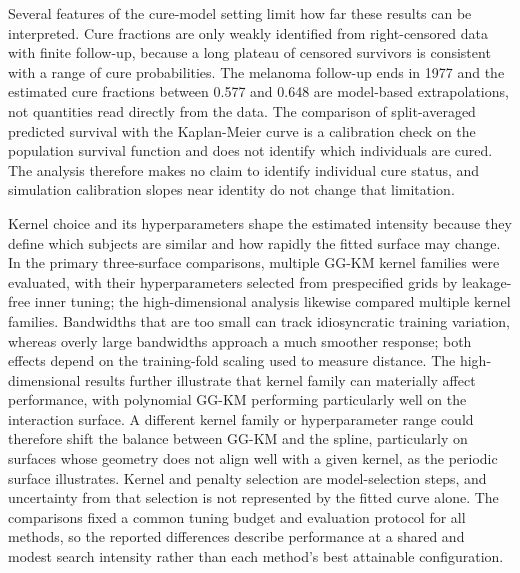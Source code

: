 Several features of the cure-model setting limit how far these results can be interpreted. Cure fractions are
only weakly identified from right-censored data with finite follow-up, because a long plateau of censored
survivors is consistent with a range of cure probabilities. The melanoma follow-up ends in 1977 and the
estimated cure fractions between 0.577 and 0.648 are model-based extrapolations, not quantities read directly
from the data. The comparison of split-averaged predicted survival with the Kaplan-Meier curve is a
calibration check on the population survival function and does not identify which individuals are cured. The
analysis therefore makes no claim to identify individual cure status, and simulation calibration slopes near
identity do not change that limitation.

Kernel choice and its hyperparameters shape the estimated intensity because they define which subjects are similar
and how rapidly the fitted surface may change. In the primary three-surface comparisons, multiple GG-KM kernel
families were evaluated, with their hyperparameters selected from prespecified grids by leakage-free inner tuning;
the high-dimensional analysis likewise compared multiple kernel families. Bandwidths that are too small can track
idiosyncratic training variation, whereas overly large bandwidths approach a much smoother response; both effects
depend on the training-fold scaling used to measure distance. The high-dimensional results further illustrate that
kernel family can materially affect performance, with polynomial GG-KM performing particularly well on the
interaction surface. A different kernel family or hyperparameter range could therefore shift the balance between
GG-KM and the spline, particularly on surfaces whose geometry does not align well with a given kernel, as the
periodic surface illustrates. Kernel and penalty selection are model-selection steps, and uncertainty from that
selection is not represented by the fitted curve alone. The comparisons fixed a common tuning budget and evaluation
protocol for all methods, so the reported differences describe performance at a shared and modest search intensity
rather than each method's best attainable configuration.

